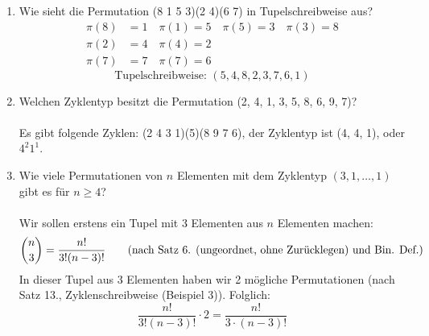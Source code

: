 \begin{enumerate}[label=(\alph*)]
        \item Wie sieht die Permutation (8 1 5 3)(2 4)(6 7) in Tupelschreibweise aus?
        \begin{align*}
        	\pi(8) &=1 \quad \pi(1)= 5 \quad \pi(5)=3 \quad \pi(3)=8\\
        	\pi(2) &=4 \quad \pi(4)=2\\
        	\pi(7) &=7 \quad \pi(7)=6
        \end{align*}
        \[\textrm{Tupelschreibweise: } (5,4,8,2,3,7,6,1)\]
        
        \item Welchen Zyklentyp besitzt die Permutation (2, 4, 1, 3, 5, 8, 6, 9, 7)?\\\\
        Es gibt folgende Zyklen: (2 4 3 1)(5)(8 9 7 6), der Zyklentyp ist (4, 4, 1), oder $4^2 1^1$.
        \item Wie viele Permutationen von $n$ Elementen mit dem Zyklentyp 
        $(3, 1, \ldots, 1)$ gibt es für $n \geq 4$?\\\\
        Wir sollen erstens ein Tupel mit 3 Elementen aus $n$ Elementen machen: 
        \[
        \binom{n}{3} = \frac{n!}{3!(n-3)!} 
        \textrm{\qquad(nach Satz 6. (ungeordnet, ohne Zur\"ucklegen) und Bin. Def.)}
        \]
        In dieser Tupel aus 3 Elementen haben wir 2 m\"ogliche Permutationen 
        (nach Satz 13., Zyklenschreibweise (Beispiel 3)). Folglich:
        \[\frac{n!}{3!(n-3)!} \cdot 2 = \frac{n!}{3\cdot(n-3)!}\]


\end{enumerate}
